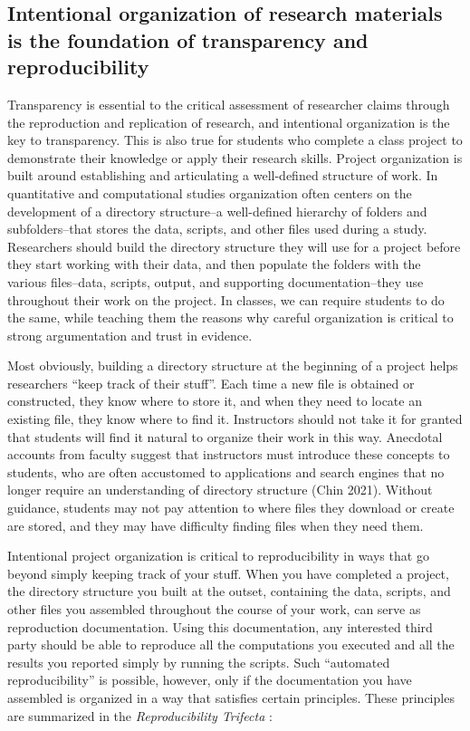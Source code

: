 \documentclass[
  12pt]{article}
\begin{document}
\subsection{ Intentional \textbf{organization} of research materials is the foundation of transparency and reproducibility} \label{proj-org}

Transparency is essential to the critical assessment of researcher claims through the reproduction and replication of research, and intentional organization is the key to transparency. 
This is also true for students who complete a class project to demonstrate their knowledge or apply their research skills.
Project organization is built around establishing and articulating a well-defined structure of work. 
In quantitative and computational studies organization often centers on the development of a directory structure–a well-defined hierarchy of folders and subfolders–that stores the data, scripts, and other files used during a study. 
Researchers should build the directory structure they will use for a project before they start working with their data, and then populate the folders with the various files–data, scripts, output, and supporting documentation–they use throughout their work on the project. 
In classes, we can require students to do the same, while teaching them the reasons why careful organization is critical to strong argumentation and trust in evidence. 

Most obviously, building a directory structure at the beginning of a project helps researchers “keep track of their stuff”. 
Each time a new file is obtained or constructed, they know where to store it, and when they need to locate an existing file, they know where to find it. 
Instructors should not take it for granted that students will find it natural to organize their work in this way. Anecdotal accounts from faculty suggest that instructors must introduce these concepts to students, who are often accustomed to applications and search engines that no longer require an understanding of directory structure (Chin 2021). 
Without guidance, students may not pay attention to where files they download or create are stored, and they may have difficulty finding files when they need them. 

Intentional project organization is critical to reproducibility in ways that go beyond simply keeping track of your stuff. 
When you have completed a project, the directory structure you built at the outset, containing the data, scripts, and other files you assembled throughout the course of your work, can serve as reproduction documentation. 
Using this documentation, any interested third party should be able to reproduce all the computations you executed and all the results you reported simply by running the scripts. 
Such “automated reproducibility” is possible, however, only if the documentation you have assembled is organized in a way that satisfies certain principles. These principles are summarized in the \emph{Reproducibility Trifecta} \citep{ball_2023}:
\end{document}
